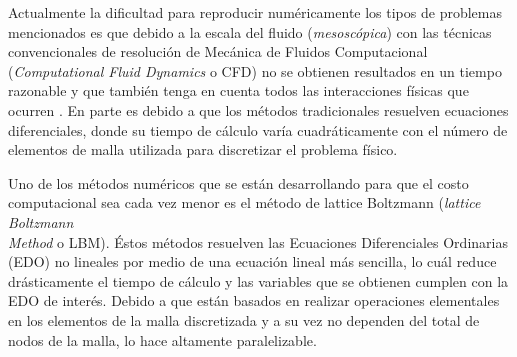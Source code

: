%
%

Actualmente la dificultad para reproducir numéricamente los tipos de problemas mencionados es que debido a la escala del fluido (\textit{mesoscópica}) con las técnicas convencionales de resolución de Mecánica de Fluidos Computacional (\textit{Computational Fluid Dynamics} o CFD) no se obtienen resultados en un tiempo razonable y que también tenga en cuenta todos las interacciones físicas que ocurren \cite{guo2013lattice}. En parte es debido a que los métodos tradicionales resuelven ecuaciones diferenciales, donde su tiempo de cálculo varía cuadráticamente con el número de elementos de malla utilizada para discretizar el problema físico.

Uno de los métodos numéricos que se están desarrollando para que el costo computacional sea cada vez menor es el método de lattice Boltzmann (\textit{lattice Boltzmann \\
Method} o LBM). Éstos métodos resuelven las Ecuaciones Diferenciales Ordinarias (EDO) no lineales por medio de una ecuación lineal más sencilla, lo cuál reduce drásticamente el tiempo de cálculo y las variables que se obtienen cumplen con la EDO de interés. Debido a que están basados en realizar operaciones elementales en los elementos de la malla discretizada y a su vez no dependen del total de nodos de la malla, lo hace altamente paralelizable. 

